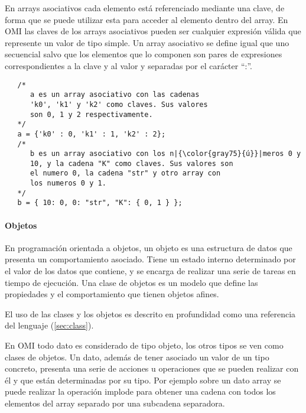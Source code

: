 En arrays asociativos cada elemento está referenciado mediante una clave, de forma que se puede utilizar esta para acceder al elemento dentro del array. En OMI las claves 
de los arrays asociativos pueden ser cualquier expresión válida que represente un valor de tipo simple. Un array asociativo se define igual que uno secuencial salvo que los elementos que lo
componen son pares de expresiones correspondientes a la clave y al valor y separadas por el carácter ``:''. \\

\begin{lstlisting}
   /*
      a es un array asociativo con las cadenas
      'k0', 'k1' y 'k2' como claves. Sus valores 
      son 0, 1 y 2 respectivamente.
   */
   a = {'k0' : 0, 'k1' : 1, 'k2' : 2};
   /* 
      b es un array asociativo con los n|{\color{gray75}{ú}}|meros 0 y
      10, y la cadena "K" como claves. Sus valores son
      el numero 0, la cadena "str" y otro array con 
      los numeros 0 y 1.
   */
   b = { 10: 0, 0: "str", "K": { 0, 1 } }; 
\end{lstlisting}


\paragraph{Objetos} \label{sec:type_object}
En programación orientada a objetos, un objeto es una estructura de datos que presenta un comportamiento asociado. Tiene un estado interno 
determinado por el valor de los datos que contiene, y se encarga de realizar una serie de tareas en tiempo de ejecución. Una clase de objetos es un
modelo que define las propiedades y el comportamiento que tienen objetos afines. 

El uso de las clases y los objetos es descrito en profundidad como una referencia del lenguaje (\autoref{sec:class}).


En OMI todo dato es considerado de tipo objeto, los otros tipos se ven como clases de objetos. Un dato, además de tener asociado un valor de un tipo concreto, 
presenta  una serie de acciones u operaciones que se pueden realizar con él y que están determinadas por su tipo. Por ejemplo sobre un dato array se puede realizar la operación
implode para obtener una cadena con todos los elementos del array separado por una subcadena separadora. \\


